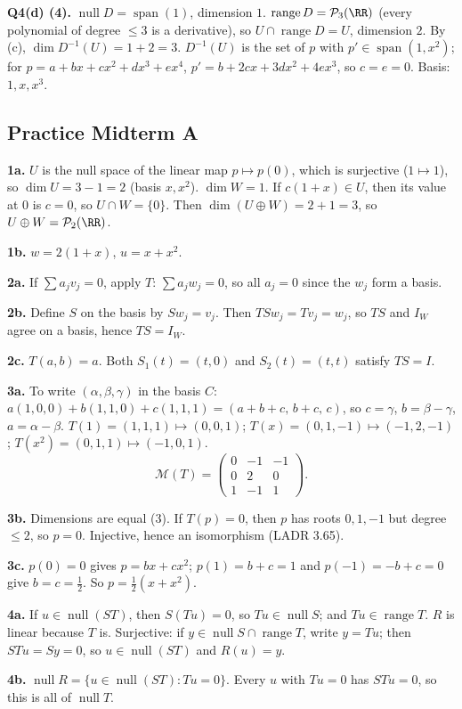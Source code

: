 \documentclass[11pt]{scrartcl}
\DeclareMathOperator{\nul}{null}
\DeclareMathOperator{\range}{range}
\DeclareMathOperator{\spn}{span}
\newcommand{\PP}{\mathcal P}
\newcommand{\MM}{\mathcal M}
\begin{document}
\medskip\noindent\textbf{Q4(d) (4).}
$\nul D=\spn(1)$, dimension $1$. $\range D=\PP_3(\RR)$ (every polynomial of degree $\le3$ is a derivative), so $U\cap\range D=U$, dimension $2$. By (c), $\dim D^{-1}(U)=1+2=3$.
$D^{-1}(U)$ is the set of $p$ with $p'\in\spn(1,x^2)$; for $p=a+bx+cx^2+dx^3+ex^4$, $p'=b+2cx+3dx^2+4ex^3$, so $c=e=0$. Basis: $1,x,x^3$.

\subsection*{Practice Midterm A}
\textbf{1a.} $U$ is the null space of the linear map $p\mapsto p(0)$, which is surjective ($1\mapsto1$), so $\dim U=3-1=2$ (basis $x,x^2$). $\dim W=1$.
If $c(1+x)\in U$, then its value at $0$ is $c=0$, so $U\cap W=\{0\}$.
Then $\dim(U\oplus W)=2+1=3$, so $U\oplus W=\PP_2(\RR)$.

\textbf{1b.} $w=2(1+x)$, $u=x+x^2$.

\textbf{2a.} If $\sum a_jv_j=0$, apply $T$: $\sum a_jw_j=0$, so all $a_j=0$ since the $w_j$ form a basis.

\textbf{2b.} Define $S$ on the basis by $Sw_j=v_j$. Then $TSw_j=Tv_j=w_j$, so $TS$ and $I_W$ agree on a basis, hence $TS=I_W$.

\textbf{2c.} $T(a,b)=a$. Both $S_1(t)=(t,0)$ and $S_2(t)=(t,t)$ satisfy $TS=I$.

\textbf{3a.} To write $(\alpha,\beta,\gamma)$ in the basis $C$: $a(1,0,0)+b(1,1,0)+c(1,1,1)=(a+b+c,\,b+c,\,c)$, so $c=\gamma$, $b=\beta-\gamma$, $a=\alpha-\beta$.
$T(1)=(1,1,1)\mapsto(0,0,1)$; $T(x)=(0,1,-1)\mapsto(-1,2,-1)$; $T(x^2)=(0,1,1)\mapsto(-1,0,1)$.
\[ \MM(T)=\begin{pmatrix}0&-1&-1\\0&2&0\\1&-1&1\end{pmatrix}. \]

\textbf{3b.} Dimensions are equal ($3$). If $T(p)=0$, then $p$ has roots $0,1,-1$ but degree $\le2$, so $p=0$. Injective, hence an isomorphism (LADR 3.65).

\textbf{3c.} $p(0)=0$ gives $p=bx+cx^2$; $p(1)=b+c=1$ and $p(-1)=-b+c=0$ give $b=c=\tfrac12$. So $p=\tfrac12(x+x^2)$.

\textbf{4a.} If $u\in\nul(ST)$, then $S(Tu)=0$, so $Tu\in\nul S$; and $Tu\in\range T$. $R$ is linear because $T$ is.
Surjective: if $y\in\nul S\cap\range T$, write $y=Tu$; then $STu=Sy=0$, so $u\in\nul(ST)$ and $R(u)=y$.

\textbf{4b.} $\nul R=\{u\in\nul(ST):Tu=0\}$. Every $u$ with $Tu=0$ has $STu=0$, so this is all of $\nul T$.
\end{document}
